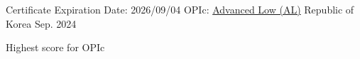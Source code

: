 

\begin{cventries}



  \cventry
    {Certificate Expiration Date: 2026/09/04} %
    {OPIc: \href{https://drive.google.com/file/d/1WA33mSp0jaU5LKnqtJ-dRN5UOLOgsfLA/view?usp=sharing}{Advanced Low (AL)}} %
    {Republic of Korea} %
    {Sep. 2024} %
    {
      \begin{cvitems} %
        \item {Highest score for OPIc}
      \end{cvitems}
    }


\end{cventries}
